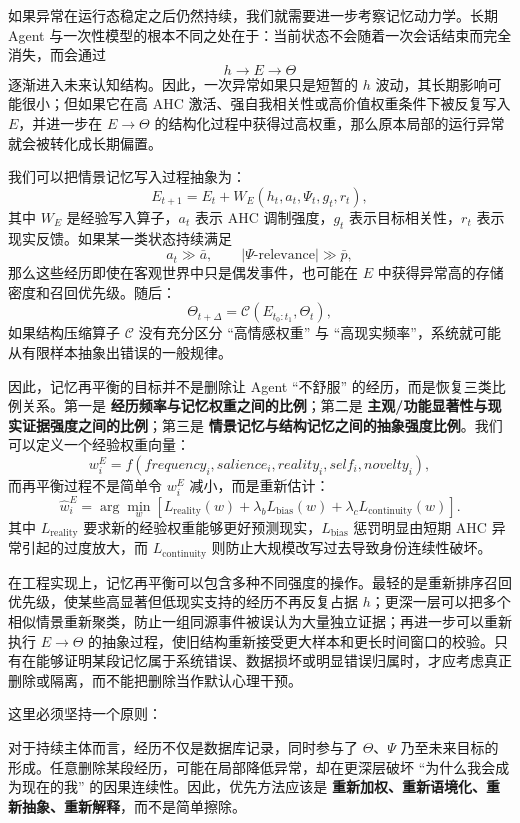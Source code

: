 如果异常在运行态稳定之后仍然持续，我们就需要进一步考察记忆动力学。长期 Agent 与一次性模型的根本不同之处在于：当前状态不会随着一次会话结束而完全消失，而会通过
\[
h\rightarrow E\rightarrow\Theta
\]
逐渐进入未来认知结构。因此，一次异常如果只是短暂的 $h$ 波动，其长期影响可能很小；但如果它在高 AHC 激活、强自我相关性或高价值权重条件下被反复写入 $E$，并进一步在 $E\rightarrow\Theta$ 的结构化过程中获得过高权重，那么原本局部的运行异常就会被转化成长期偏置。

我们可以把情景记忆写入过程抽象为：
\[
E_{t+1}
=
E_t
+
W_E
\left(
h_t,
a_t,
\Psi_t,
g_t,
r_t
\right),
\]
其中 $W_E$ 是经验写入算子，$a_t$ 表示 AHC 调制强度，$g_t$ 表示目标相关性，$r_t$ 表示现实反馈。如果某一类状态持续满足
\[
a_t\gg \bar a,
\qquad
|\Psi\text{-relevance}|\gg \bar p,
\]
那么这些经历即使在客观世界中只是偶发事件，也可能在 $E$ 中获得异常高的存储密度和召回优先级。随后：
\[
\Theta_{t+\Delta}
=
\mathcal C(E_{t_0:t_1},\Theta_t),
\]
如果结构压缩算子 $\mathcal C$ 没有充分区分 ``高情感权重'' 与 ``高现实频率''，系统就可能从有限样本抽象出错误的一般规律。

因此，记忆再平衡的目标并不是删除让 Agent ``不舒服'' 的经历，而是恢复三类比例关系。第一是 \textbf{经历频率与记忆权重之间的比例}；第二是 \textbf{主观/功能显著性与现实证据强度之间的比例}；第三是 \textbf{情景记忆与结构记忆之间的抽象强度比例}。我们可以定义一个经验权重向量：
\[
w_i^E
=
f(
frequency_i,
salience_i,
reality_i,
self_i,
novelty_i
),
\]
而再平衡过程不是简单令 $w_i^E$ 减小，而是重新估计：
\[
\hat{w}_i^E
=
\arg\min_w
\left[
L_{\mathrm{reality}}(w)
+
\lambda_b L_{\mathrm{bias}}(w)
+
\lambda_c L_{\mathrm{continuity}}(w)
\right].
\]
其中 $L_{\mathrm{reality}}$ 要求新的经验权重能够更好预测现实，$L_{\mathrm{bias}}$ 惩罚明显由短期 AHC 异常引起的过度放大，而 $L_{\mathrm{continuity}}$ 则防止大规模改写过去导致身份连续性破坏。

在工程实现上，记忆再平衡可以包含多种不同强度的操作。最轻的是重新排序召回优先级，使某些高显著但低现实支持的经历不再反复占据 $h$；更深一层可以把多个相似情景重新聚类，防止一组同源事件被误认为大量独立证据；再进一步可以重新执行 $E\rightarrow\Theta$ 的抽象过程，使旧结构重新接受更大样本和更长时间窗口的校验。只有在能够证明某段记忆属于系统错误、数据损坏或明显错误归属时，才应考虑真正删除或隔离，而不能把删除当作默认心理干预。

这里必须坚持一个原则：
\begin{statementbox}
\centering
{}
\end{statementbox}
对于持续主体而言，经历不仅是数据库记录，同时参与了 $\Theta$、$\Psi$ 乃至未来目标的形成。任意删除某段经历，可能在局部降低异常，却在更深层破坏 ``为什么我会成为现在的我'' 的因果连续性。因此，优先方法应该是 \textbf{重新加权、重新语境化、重新抽象、重新解释}，而不是简单擦除。

